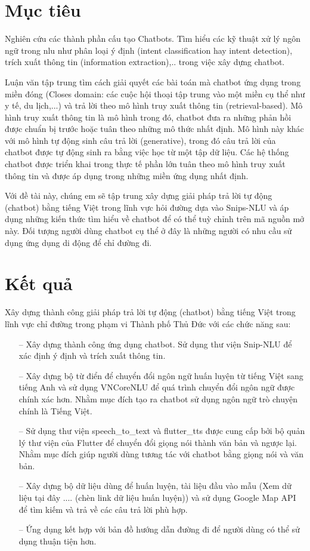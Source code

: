 \section{Mục tiêu}

Nghiên cứu các thành phần cấu tạo Chatbots. Tìm hiểu các kỹ thuật xử lý ngôn ngữ trong \ac{nlu} như phân loại ý định (intent classification hay intent detection), trích xuất thông tin (information extraction),.. trong việc xây dựng chatbot.

Luận văn tập trung tìm cách giải quyết các bài toán mà chatbot ứng dụng trong miền đóng (Closes domain: các cuộc hội thoại tập trung vào một miền cụ thể như y tế, du lịch,...) và trả lời theo mô hình truy xuất thông tin (retrieval-based). Mô hình truy xuất thông tin là mô hình trong đó, chatbot đưa ra những phản hồi được chuẩn bị trước hoặc tuân theo những mô thức nhất định. Mô hình này khác với mô hình tự động sinh câu trả lời (generative), trong đó câu trả lời của chatbot được tự động sinh ra bằng việc học từ một tập dữ liệu. Các hệ thống chatbot được triển khai trong thực tế phần lớn tuân theo mô hình truy xuất thông tin và được áp dụng trong những miền ứng dụng nhất định.

Với đề tài này, chúng em sẽ tập trung xây dựng giải pháp trả lời tự động (chatbot) bằng tiếng Việt trong lĩnh vực hỏi đường dựa vào Snips-NLU và áp dụng những kiến thức tìm hiểu về chatbot để có thể tuỳ chỉnh trên mã nguồn mở này. Đối tượng người dùng chatbot cụ thể ở đây là những người có nhu cầu sử dụng ứng dụng di động để chỉ đường đi.

\section{Kết quả}
Xây dựng thành công giải pháp trả lời tự động (chatbot) bằng tiếng Việt trong lĩnh vực chỉ đường trong phạm vi Thành phố Thủ Đức với các chức năng sau:
\begin{itemize}
    \item[--] Xây dựng thành công ứng dụng chatbot. Sử dụng thư viện Snip-NLU\cite{Snipsnlu} để xác định ý định và trích xuất thông tin.
    \item[--] Xây dựng bộ từ điển để chuyển đổi ngôn ngữ huấn luyện từ tiếng Việt sang tiếng Anh và sử dụng VNCoreNLU\cite{vncorenlu} để quá trình chuyển đổi ngôn ngữ được chính xác hơn. Nhằm mục đích tạo ra chatbot sử dụng ngôn ngữ trò chuyện chính là Tiếng Việt.
    \item[--] Sử dụng thư viện speech\_to\_text\cite{stt} và flutter\_tts\cite{tts} được cung cấp bởi bộ quản lý thư viện của Flutter để chuyển đổi giọng nói thành văn bản và ngược lại. Nhằm mục đích giúp người dùng tương tác với chatbot bằng giọng nói và văn bản.
    \item[--] Xây dựng bộ dữ liệu dùng để huấn luyện, tài liệu đầu vào mẫu (Xem dữ liệu tại đây .... (chèn link dữ liệu huấn luyện)) và sử dụng Google Map API\cite{ggmaps} để tìm kiếm và trả về các câu trả lời phù hợp.
    \item[--] Ứng dụng kết hợp với bản đồ hướng dẫn đường đi để người dùng có thể sử dụng thuận tiện hơn.
\end{itemize}



